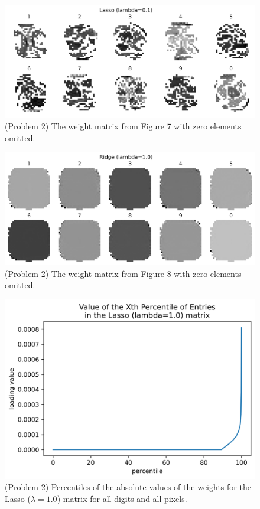 \documentclass[10pt]{article}
\begin{document}
\begin{figure}[ht]
\centerline{\includegraphics[scale=0.75]{figures/weight_matrix_lasso_01_no_zeros.png}}
\caption{(Problem 2) The weight matrix from Figure 7 with zero elements omitted.}
\label{fig12}
\end{figure}

\begin{figure}[ht]
\centerline{\includegraphics[scale=0.75]{figures/weight_matrix_ridge_no_zeros.png}}
\caption{(Problem 2) The weight matrix from Figure 8 with zero elements omitted.}
\label{fig13}
\end{figure}

\begin{figure}[ht]
\centerline{\includegraphics[scale=0.9]{figures/lasso_loading_percentiles-see_uptick_at_90.png}}
\caption{(Problem 2) Percentiles of the absolute values of the weights for the Lasso ($\lambda=1.0$) matrix for all digits and all pixels.}
\label{fig14}
\end{figure}
\end{document}
